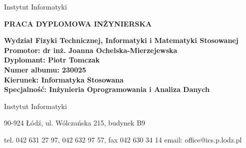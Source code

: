 {\begin{titlepage}
\begin{adjustwidth}{0cm}{0pt}
\begin{flushleft}
        {\selectfont\normalsize
        \textcolor{politechniczny}{Instytut Informatyki}}
    \end{flushleft}
    \end{adjustwidth}
    
    \begin{center}
        \vspace*{1.53cm}
        {\selectfont\large
        \uppercase{\textbf{Praca dyplomowa in\.zynierska}}
        
        \vspace*{5.1cm}
        
        \fontsize{18pt}{22pt}\selectfont
        \textbf{\thetitle}}
        
        \vfill
    \end{center}
    
    {\selectfont\normalsize
    \begin{adjustwidth}{1cm}{0pt}
    \begin{flushleft}
        \textbf{Wydział Fizyki Technicznej, Informatyki i Matematyki Stosowanej}\\
        \textbf{Promotor: dr inż. Joanna Ochelska-Mierzejewska}\\
        \textbf{Dyplomant: Piotr Tomczak}\\
        \textbf{Numer albumu: 230025}\\
        \textbf{Kierunek: Informatyka Stosowana}\\
        \textbf{Specjalność: Inżynieria Oprogramowania i Analiza Danych}
    \end{flushleft}
    \end{adjustwidth}
    
    \begin{center}
        \thedate
        \vspace*{2.05cm}
    \end{center}}
    
    \begin{adjustwidth}{0cm}{0pt}
    \begin{flushleft}
        {\selectfont\footnotesize
        \textcolor{politechniczny}{Instytut Informatyki}}
        
        \vspace*{0.1cm}
        
        {\selectfont\tiny
        90-924 \L{}\'od\'z, ul. W\'olcza\'nska 215, \textcolor{politechniczny}{budynek B9}
        
        \vspace*{-0.5cm}
        
        tel. 042 631 27 97, 042 632 97 57, fax 042 630 34 14 email: office@ics.p.lodz.pl}
        \vspace{-1.4cm}
    \end{flushleft}
    \end{adjustwidth}
\end{titlepage}}
\renewcommand{\baselinestretch}{1.5}